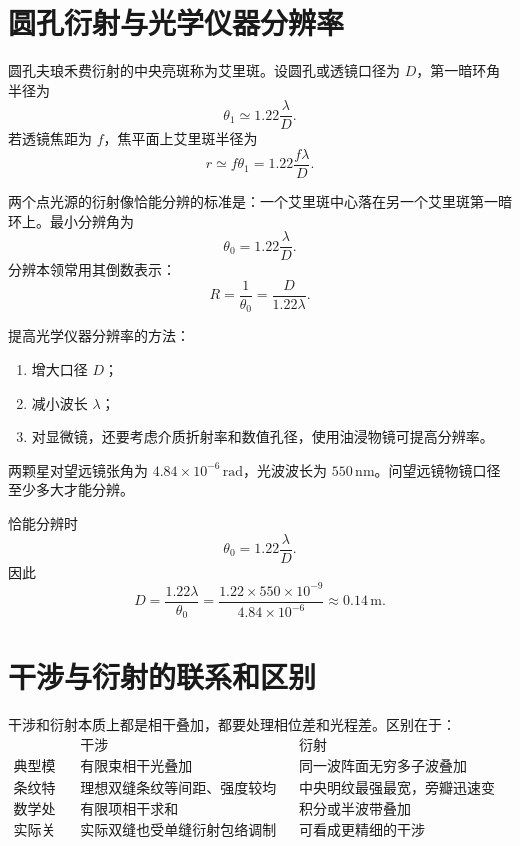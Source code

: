 \section{圆孔衍射与光学仪器分辨率}

圆孔夫琅禾费衍射的中央亮斑称为艾里斑。设圆孔或透镜口径为 $D$，第一暗环角半径为
\[
  \theta_1\simeq1.22\frac{\lambda}{D}.
\]
若透镜焦距为 $f$，焦平面上艾里斑半径为
\[
  r\simeq f\theta_1=1.22\frac{f\lambda}{D}.
\]

\begin{definition}[瑞利判据]\label{def:rayleigh-criterion}
两个点光源的衍射像恰能分辨的标准是：一个艾里斑中心落在另一个艾里斑第一暗环上。最小分辨角为
\[
  \theta_0=1.22\frac{\lambda}{D}.
\]
分辨本领常用其倒数表示：
\[
  R=\frac1{\theta_0}=\frac{D}{1.22\lambda}.
\]
\end{definition}

提高光学仪器分辨率的方法：
\begin{enumerate}
  \item 增大口径 $D$；
  \item 减小波长 $\lambda$；
  \item 对显微镜，还要考虑介质折射率和数值孔径，使用油浸物镜可提高分辨率。
\end{enumerate}

\begin{example}[title={望远镜口径}]\label{eg:telescope-resolution}
两颗星对望远镜张角为 $4.84\times10^{-6}\,\mathrm{rad}$，光波波长为 $550\,\mathrm{nm}$。问望远镜物镜口径至少多大才能分辨。

\begin{solution}
恰能分辨时
\[
  \theta_0=1.22\frac{\lambda}{D}.
\]
因此
\[
  D=\frac{1.22\lambda}{\theta_0}
  =\frac{1.22\times550\times10^{-9}}{4.84\times10^{-6}}
  \approx0.14\,\mathrm{m}.
\]
\end{solution}
\end{example}

\section{干涉与衍射的联系和区别}

干涉和衍射本质上都是相干叠加，都要处理相位差和光程差。区别在于：
\[
\begin{array}{c|c|c}
 & \text{干涉} & \text{衍射}\\
\hline
\text{典型模型} & \text{有限束相干光叠加} & \text{同一波阵面无穷多子波叠加}\\
\text{条纹特点} & \text{理想双缝条纹等间距、强度较均匀} & \text{中央明纹最强最宽，旁瓣迅速变弱}\\
\text{数学处理} & \text{有限项相干求和} & \text{积分或半波带叠加}\\
\text{实际关系} & \text{实际双缝也受单缝衍射包络调制} & \text{可看成更精细的干涉}
\end{array}
\]

